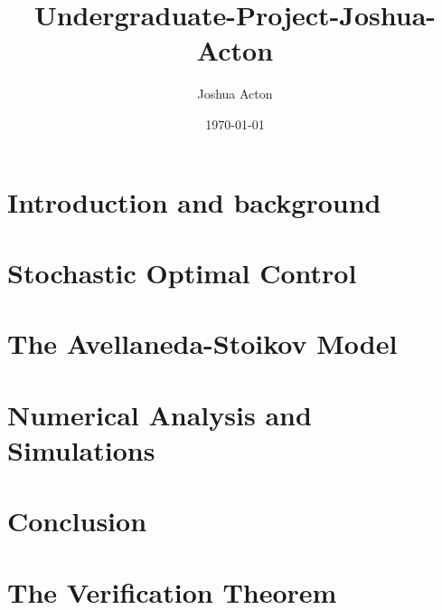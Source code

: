 \documentclass[11pt,twoside]{report}
\title{Undergraduate-Project-Joshua-Acton}
\author{Joshua Acton}
\date{\today}
\theoremstyle{definition}
\theoremstyle{remark}
\begin{document}


%

%

%



\tableofcontents

\newpage
{}
\listoffigures

\chapter{Introduction and background}\label{chap:1}


\chapter{Stochastic Optimal Control}\label{chap:2}


\chapter{The Avellaneda-Stoikov Model}\label{chap:3}


%

\chapter{Numerical Analysis and Simulations}


\chapter{Conclusion}


\printbibliography[heading=bibintoc]

\appendix
\chapter{The Verification Theorem}

\end{document}
